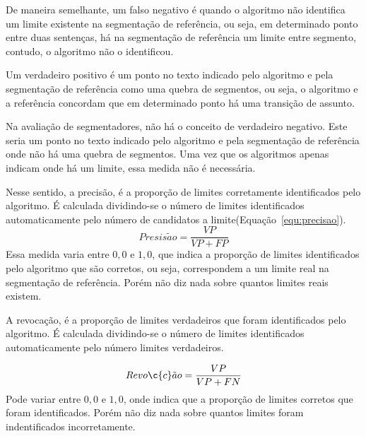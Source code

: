 %
De maneira semelhante, um falso negativo é quando o algoritmo não identifica um limite existente na segmentação de referência, ou seja, em determinado ponto entre duas sentenças, há na segmentação de referência um limite entre segmento, contudo, o algoritmo não o identificou.

%
Um verdadeiro positivo é um ponto no texto indicado pelo algoritmo e pela segmentação de referência como uma quebra de segmentos, ou seja, o algoritmo e a referência concordam que em determinado ponto há uma transição de assunto.

%
Na avaliação de segmentadores, não há o conceito de verdadeiro negativo. Este seria um ponto no texto indicado pelo algoritmo e pela segmentação de referência onde não há uma quebra de segmentos. Uma vez que os algoritmos apenas indicam onde há um limite, essa medida não é necessária. %



Nesse sentido, 
%
a precisão, é a proporção de limites corretamente identificados pelo algoritmo. 
%
É calculada dividindo-se o número de limites identificados automaticamente pelo número de candidatos a limite(Equação~\ref{equ:precisao}).
% 
\begin{equation}
	Presis\tilde{a}o = \frac{VP}{VP+FP}
	\label{equ:precisao}
\end{equation}
%
Essa medida varia entre $0,0$ e $1,0$, que indica a proporção de limites identificados pelo algoritmo que são corretos, ou seja, correspondem a um limite real na segmentação de referência. Porém não diz nada sobre quantos limites reais existem. 



%
A revocação, é a proporção de limites verdadeiros que foram identificados pelo algoritmo.
%
É calculada dividindo-se o número de limites identificados automaticamente pelo número limites verdadeiros.


% 
\begin{equation}
	Revo\c{c}\tilde{a}o = \frac{VP}{VP+FN}
	\label{equ:revocacao}
\end{equation}
%
Pode variar entre $0,0$ e $1,0$, onde indica que a proporção de limites corretos que foram identificados. Porém não diz nada sobre quantos limites foram indentificados incorretamente. 

